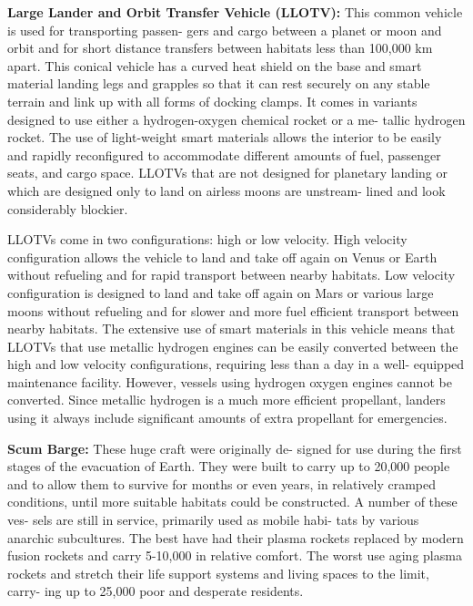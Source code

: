 \textbf{Large Lander and Orbit Transfer Vehicle (LLOTV):}
This common vehicle is used for transporting passen-
gers and cargo between a planet or moon and orbit 
and for short distance transfers between habitats 
less than 100,000 km apart. This conical vehicle has 
a curved heat shield on the base and smart material 
landing legs and grapples so that it can rest securely 
on any stable terrain and link up with all forms of 
docking clamps. It comes in variants designed to use 
either a hydrogen-oxygen chemical rocket or a me-
tallic hydrogen rocket. The use of light-weight smart 
materials allows the interior to be easily and rapidly 
reconfigured to accommodate different amounts of 
fuel, passenger seats, and cargo space. LLOTVs that 
are not designed for planetary landing or which are 
designed only to land on airless moons are unstream-
lined and look considerably blockier.

LLOTVs come in two configurations: high or low 
velocity. High velocity configuration allows the vehicle 
to land and take off again on Venus or Earth without 
refueling and for rapid transport between nearby 
habitats. Low velocity configuration is designed to 
land and take off again on Mars or various large 
moons without refueling and for slower and more 
fuel efficient transport between nearby habitats. The 
extensive use of smart materials in this vehicle means 
that LLOTVs that use metallic hydrogen engines can 
be easily converted between the high and low velocity 
configurations, requiring less than a day in a well-
equipped maintenance facility. However, vessels using 
hydrogen oxygen engines cannot be converted. Since 
metallic hydrogen is a much more efficient propellant, 
landers using it always include significant amounts of 
extra propellant for emergencies.

\textbf{Scum Barge:} These huge craft were originally de-
signed for use during the first stages of the evacuation 
of Earth. They were built to carry up to 20,000 people 
and to allow them to survive for months or even years, 
in relatively cramped conditions, until more suitable 
habitats could be constructed. A number of these ves-
sels are still in service, primarily used as mobile habi-
tats by various anarchic subcultures. The best have 
had their plasma rockets replaced by modern fusion 
rockets and carry 5-10,000 in relative comfort. The 
worst use aging plasma rockets and stretch their life 
support systems and living spaces to the limit, carry-
ing up to 25,000 poor and desperate residents.

